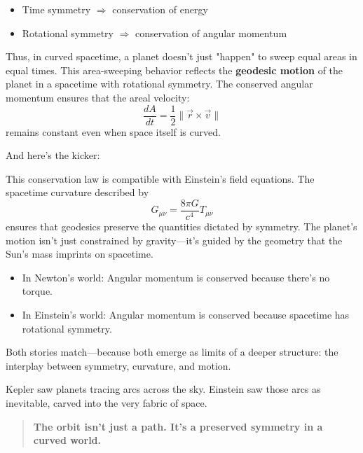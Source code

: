 \begin{itemize}
  \item Time symmetry \( \Rightarrow \) conservation of energy
  \item Rotational symmetry \( \Rightarrow \) conservation of angular momentum
\end{itemize}

Thus, in curved spacetime, a planet doesn’t just "happen" to sweep equal areas in equal times. This area-sweeping behavior reflects the \textbf{geodesic motion} of the planet in a spacetime with rotational symmetry. The conserved angular momentum ensures that the areal velocity:
\[
\frac{dA}{dt} = \frac{1}{2} \| \vec{r} \times \vec{v} \|
\]
remains constant even when space itself is curved.

And here’s the kicker:

This conservation law is compatible with Einstein’s field equations. The spacetime curvature described by 
\[
G_{\mu\nu} = \frac{8\pi G}{c^4} T_{\mu\nu}
\]
ensures that geodesics preserve the quantities dictated by symmetry. The planet’s motion isn’t just constrained by gravity—it’s guided by the geometry that the Sun’s mass imprints on spacetime.

\begin{tcolorbox}[colback=blue!5!white, colframe=blue!50!black, title={Kepler’s Law in Einstein’s Universe}]
\begin{itemize}
  \item In Newton’s world: Angular momentum is conserved because there’s no torque.
  \item In Einstein’s world: Angular momentum is conserved because spacetime has rotational symmetry.
\end{itemize}

Both stories match—because both emerge as limits of a deeper structure: the interplay between symmetry, curvature, and motion.
\end{tcolorbox}

Kepler saw planets tracing arcs across the sky.  
Einstein saw those arcs as inevitable, carved into the very fabric of space.

\begin{quote}
\textbf{The orbit isn’t just a path. It’s a preserved symmetry in a curved world.}
\end{quote}

